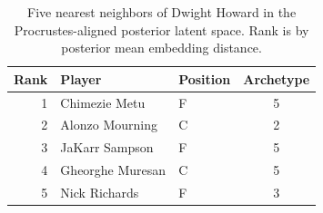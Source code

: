 \begin{table}[htbp]
  \centering\small
  \begin{tabular}{rllc}
    \toprule
    Rank & Player & Position & Archetype \\
    \midrule
    1 & Chimezie Metu & F & 5 \\
    2 & Alonzo Mourning & C & 2 \\
    3 & JaKarr Sampson & F & 5 \\
    4 & Gheorghe Muresan & C & 5 \\
    5 & Nick Richards & F & 3 \\
    \bottomrule
  \end{tabular}
  \caption{Five nearest neighbors of Dwight Howard in the Procrustes-aligned posterior latent space. Rank is by posterior mean embedding distance.}
  \label{tab:Dwight_Howard_neighbors}
\end{table}

